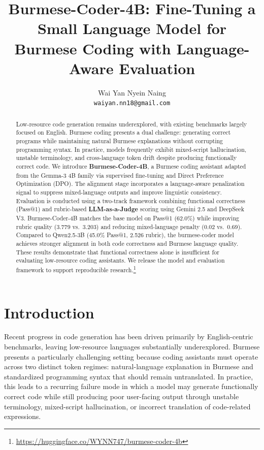 \documentclass[11pt]{article}
\title{\textbf{Burmese-Coder-4B: Fine-Tuning a Small Language Model for Burmese Coding with Language-Aware Evaluation}}
\author{
  Wai Yan Nyein Naing \\
  \texttt{waiyan.nn18@gmail.com}
}
\date{}
\begin{document}
\maketitle

\begin{abstract}
Low-resource code generation remains underexplored, with existing benchmarks largely focused on English. Burmese coding presents a dual challenge: generating correct programs while maintaining natural Burmese explanations without corrupting programming syntax. In practice, models frequently exhibit mixed-script hallucination, unstable terminology, and cross-language token drift despite producing functionally correct code. We introduce \textbf{Burmese-Coder-4B}, a Burmese coding assistant adapted from the Gemma-3 4B family via supervised fine-tuning and Direct Preference Optimization (DPO). The alignment stage incorporates a language-aware penalization signal to suppress mixed-language outputs and improve linguistic consistency.
Evaluation is conducted using a two-track framework combining functional correctness (Pass@1) and rubric-based \textbf{LLM-as-a-Judge} scoring using Gemini 2.5 and DeepSeek V3. Burmese-Coder-4B matches the base model on Pass@1 (62.0\%) while improving rubric quality (3.779 vs.\ 3.203) and reducing mixed-language penalty (0.02 vs.\ 0.69). Compared to Qwen2.5-3B (45.0\% Pass@1, 2.526 rubric), the burmese-coder model achieves stronger alignment in both code correctness and Burmese language quality. These results demonstrate that functional correctness alone is insufficient for evaluating low-resource coding assistants. We release the model and evaluation framework to support reproducible research.\footnote{\url{https://huggingface.co/WYNN747/burmese-coder-4b}}
\end{abstract}

\section{Introduction}
Recent progress in code generation has been driven primarily by English-centric benchmarks, leaving low-resource languages substantially underexplored. Burmese presents a particularly challenging setting because coding assistants must operate across two distinct token regimes: natural-language explanation in Burmese and standardized programming syntax that should remain untranslated. In practice, this leads to a recurring failure mode in which a model may generate functionally correct code while still producing poor user-facing output through unstable terminology, mixed-script hallucination, or incorrect translation of code-related expressions.
\end{document}
